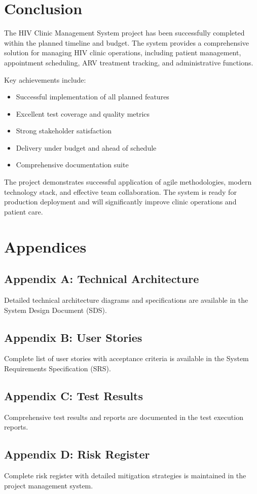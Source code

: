 \documentclass[12pt,a4paper]{article}
\begin{document}
\section{Conclusion}

The HIV Clinic Management System project has been successfully completed within the planned timeline and budget. The system provides a comprehensive solution for managing HIV clinic operations, including patient management, appointment scheduling, ARV treatment tracking, and administrative functions.

Key achievements include:
\begin{itemize}
    \item Successful implementation of all planned features
    \item Excellent test coverage and quality metrics
    \item Strong stakeholder satisfaction
    \item Delivery under budget and ahead of schedule
    \item Comprehensive documentation suite
\end{itemize}

The project demonstrates successful application of agile methodologies, modern technology stack, and effective team collaboration. The system is ready for production deployment and will significantly improve clinic operations and patient care.

\section{Appendices}

\subsection{Appendix A: Technical Architecture}
Detailed technical architecture diagrams and specifications are available in the System Design Document (SDS).

\subsection{Appendix B: User Stories}
Complete list of user stories with acceptance criteria is available in the System Requirements Specification (SRS).

\subsection{Appendix C: Test Results}
Comprehensive test results and reports are documented in the test execution reports.

\subsection{Appendix D: Risk Register}
Complete risk register with detailed mitigation strategies is maintained in the project management system.
\end{document}
